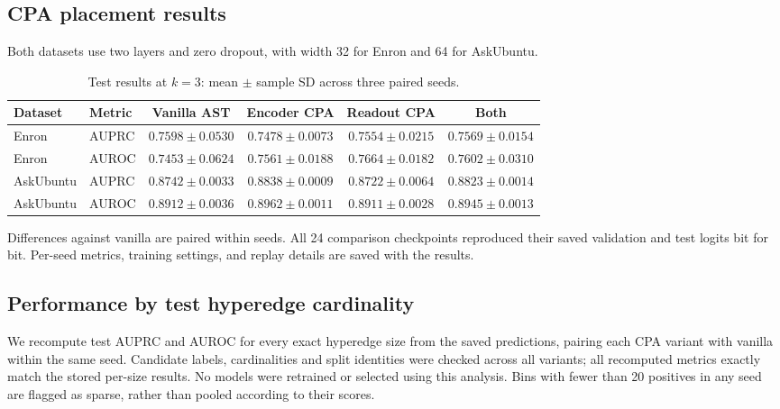 \documentclass{article}
\begin{document}
\subsection{CPA placement results}
Both datasets use two layers and zero dropout, with width 32 for Enron and 64 for AskUbuntu.

\begin{table}[t]
\centering
\small
\caption{Test results at $k=3$: mean $\pm$ sample SD across three paired seeds.}
\label{tab:current}
\begin{tabular}{llcccc}
\toprule
Dataset & Metric & Vanilla AST & Encoder CPA & Readout CPA & Both \\
\midrule
Enron & AUPRC & $0.7598\pm0.0530$ & $0.7478\pm0.0073$ & $0.7554\pm0.0215$ & $0.7569\pm0.0154$ \\
Enron & AUROC & $0.7453\pm0.0624$ & $0.7561\pm0.0188$ & $0.7664\pm0.0182$ & $0.7602\pm0.0310$ \\
AskUbuntu & AUPRC & $0.8742\pm0.0033$ & $0.8838\pm0.0009$ & $0.8722\pm0.0064$ & $0.8823\pm0.0014$ \\
AskUbuntu & AUROC & $0.8912\pm0.0036$ & $0.8962\pm0.0011$ & $0.8911\pm0.0028$ & $0.8945\pm0.0013$ \\
\bottomrule
\end{tabular}
\end{table}

Differences against vanilla are paired within seeds. All 24 comparison checkpoints reproduced their saved validation and test logits bit for bit. Per-seed metrics, training settings, and replay details are saved with the results.

\subsection{Performance by test hyperedge cardinality}
We recompute test AUPRC and AUROC for every exact hyperedge size from the saved predictions, pairing each CPA variant with vanilla within the same seed. Candidate labels, cardinalities and split identities were checked across all variants; all recomputed metrics exactly match the stored per-size results. No models were retrained or selected using this analysis. Bins with fewer than 20 positives in any seed are flagged as sparse, rather than pooled according to their scores.
\end{document}
